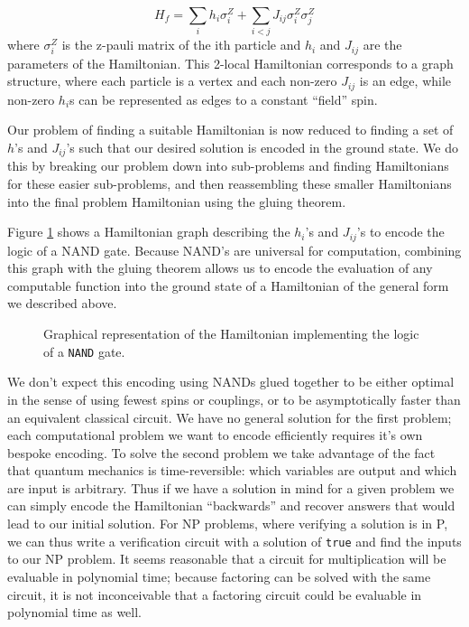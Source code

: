 \begin{displaymath}
	H_f = \sum_{i} h_i \sigma_i^Z + \sum_{i < j} J_{ij} \sigma_i^Z\sigma_j^Z 
\end{displaymath}
where $\sigma_i^Z$ is the z-pauli matrix of the ith particle and $h_i$ and $J_{ij}$ are the parameters of the Hamiltonian.  This 2-local Hamiltonian corresponds to a graph structure, where each particle is a vertex and each non-zero $J_{ij}$ is an edge, while non-zero $h_i$s can be represented as edges to a constant ``field'' spin.

Our problem of finding a suitable Hamiltonian is now reduced to finding a set of $h$'s and $J_{ij}$'s such that our desired solution is encoded in the ground state.  We do this by breaking our problem down into sub-problems and finding Hamiltonians for these easier sub-problems, and then reassembling these smaller Hamiltonians into the final problem Hamiltonian using the gluing theorem.\cite{gluing}

Figure \ref{fig:nand_graph} shows a Hamiltonian graph describing the $h_i$'s and $J_{ij}$'s to encode the logic of a NAND gate.  Because NAND's are universal for computation, combining this graph with the gluing theorem allows us to encode the evaluation of any computable function into the ground state of a Hamiltonian of the general form we described above.  

\begin{figure}
	\caption[\texttt{NAND} Graph]{Graphical representation of the Hamiltonian implementing the logic of a \texttt{NAND} gate.}
	\label{fig:nand_graph}
\end{figure}


We don't expect this encoding using NANDs glued together to be either optimal in the sense of using fewest spins or couplings, or to be asymptotically faster than an equivalent classical circuit.  We have no general solution for the first problem; each computational problem we want to encode efficiently requires it's own bespoke encoding.  
To solve the second problem we take advantage of the fact that quantum mechanics is time-reversible: which variables are output and which are input is arbitrary.  
Thus if we have a solution in mind for a given problem we can simply encode the Hamiltonian ``backwards'' and recover answers that would lead to our initial solution.  For NP problems, where verifying a solution is in P, we can thus write a verification circuit with a solution of \texttt{true} and find the inputs to our NP problem.
It seems reasonable that a circuit for multiplication will be evaluable in polynomial time; because factoring can be solved with the same circuit, it is not inconceivable that a factoring circuit could be evaluable in polynomial time as well.

